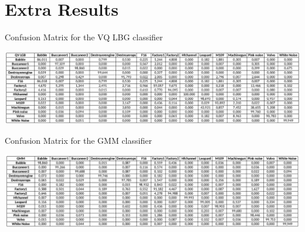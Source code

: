 \documentclass[12pt]{article}
\begin{document}







\appendix

\section{Extra Results} \label{extra}

\begin{table}[ht]
\centering
\caption{Confusion Matrix for the VQ LBG classifier}
\label{tab:confusion_vqlbg}
\includegraphics[width=\textwidth]{conf_qvlbg.png}
\end{table}

\begin{table}[h]
\centering
\caption{Confusion Matrix for the GMM classifier}
\label{tab:confusion_gmm}
\includegraphics[width=\textwidth]{conf_gmm.png}
\end{table}
\end{document}
